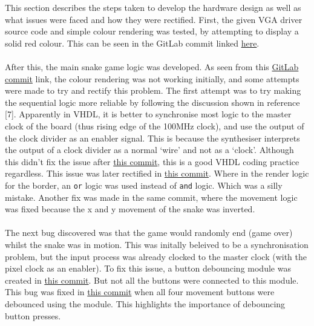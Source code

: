 \documentclass[aps, secnumarabic, balancelastpage, asmath, amssymb, nofootinbib, floatfix,]{revtex4-2}
\begin{document}
{This section describes the steps taken to develop the hardware design as well as what issues were faced and how they were rectified. First, the given VGA driver source code and simple colour rendering was tested, by attempting to display a solid red colour. This can be seen in the GitLab commit linked \href{https://cseegit.essex.ac.uk/23-24-ce339/23-24_CE339_gopinath_akshay/-/commit/41b12159ecd4fd75b2ae10749d8d0f7c15da76b0}{here}. \\
\\
After this, the main snake game logic was developed. As seen from this \href{https://cseegit.essex.ac.uk/23-24-ce339/23-24_CE339_gopinath_akshay/-/commit/911c4fae4d40bebe5094a92a998859baa51b185a}{GitLab commit} link, the colour rendering was not working initially, and some attempts were made to try and rectify this problem. The first attempt was to try making the sequential logic more reliable by following the discussion shown in reference [7]. Apparently in VHDL, it is better to synchronise most logic to the master clock of the board (thus rising edge of the 100MHz clock), and use the output of the clock divider as an enabler signal. This is because the synthesiser interprets the output of a clock divider as a normal `wire' and not as a `clock'. Although this didn't fix the issue after \href{https://cseegit.essex.ac.uk/23-24-ce339/23-24_CE339_gopinath_akshay/-/commit/18064c441e06b2e87fbe97886cf5f8ecc04e3233}{this commit}, this is a good VHDL coding practice regardless. This issue was later rectified in \href{https://cseegit.essex.ac.uk/23-24-ce339/23-24_CE339_gopinath_akshay/-/commit/08e170dc860f38bff83c3967aa89f9bca4223632}{this commit}. Where in the render logic for the border, an \verb|or| logic was used instead of \verb|and| logic. Which was a silly mistake. Another fix was made in the same commit, where the movement logic was fixed because the x and y movement of the snake was inverted. \\
~\\
The next  bug discovered was that the game would randomly end (game over) whilst the snake was in motion. This was initally beleived to be a synchronisation problem, but the input process was already clocked to the master clock (with the pixel clock as an enabler). To fix this issue, a button debouncing module was created in \href{https://cseegit.essex.ac.uk/23-24-ce339/23-24_CE339_gopinath_akshay/-/commit/2c20b371731b9e364c1e1e8525bab0f203cde461}{this commit}. But not all the buttons were connected to this module. This bug was fixed in \href{https://cseegit.essex.ac.uk/23-24-ce339/23-24_CE339_gopinath_akshay/-/commit/9eff36c14714be44cf6d5e24563ecbe0abaf9896}{this commit} when all four movement buttons were debounced using the module. This highlights the importance of debouncing button presses. \\

}
\end{document}
